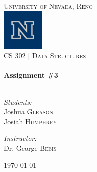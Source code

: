 \begin{titlepage}
	\begin{center}

		\textsc{\LARGE University of Nevada, Reno}\\[.5cm]
		\includegraphics[width=0.15\textwidth]{./logo.png}\\[.5cm]

		\textsc{\large CS 302 | Data Structures } \\[.5cm]

		\HRule \\[0.4cm]
		{ \huge \bfseries Assignment \#3}\\[0.4cm]

		\HRule \\[1.5cm]

		\begin{minipage}{0.4\textwidth}
			\begin{flushleft} \large
				\emph{Students:}\\
				Joshua \textsc{Gleason}\\
				Josiah \textsc{Humphrey}
			\end{flushleft}
		\end{minipage}
		\begin{minipage}{0.4\textwidth}
			\begin{flushright} \large
				\emph{Instructor:} \\
				Dr. George \textsc{Bebis}
			\end{flushright}
		\end{minipage}

		\vfill

		{\large \today}

	\end{center}

\end{titlepage}
